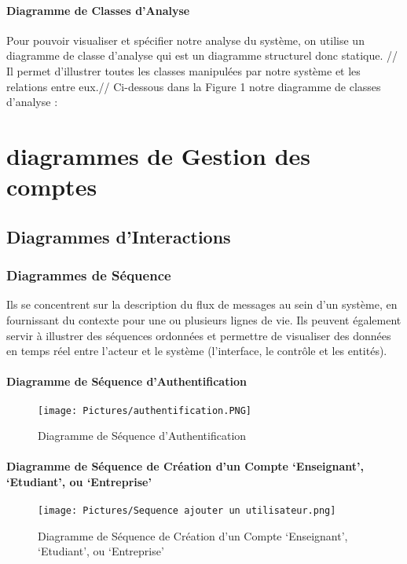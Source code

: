 \documentclass[11pt,fleqn]{book} %
\begin{document}
\subsubsection{Diagramme de Classes d’Analyse}
Pour pouvoir visualiser et spécifier notre analyse du système, on utilise un diagramme de classe d’analyse qui est un diagramme structurel donc statique. //
Il permet d’illustrer toutes les classes manipulées par notre système et les relations 
entre eux.//
Ci-dessous dans la Figure 1 notre diagramme de classes d’analyse :
\chapter{diagrammes de Gestion des comptes}
\section{Diagrammes d'Interactions}
\subsection{Diagrammes de Séquence}
Ils se concentrent sur la description du flux de messages au sein d'un système, en fournissant du contexte pour une ou plusieurs lignes de vie. Ils peuvent également servir à illustrer des séquences ordonnées et permettre de visualiser des données en temps réel entre l’acteur et le système (l’interface, le contrôle et les entités).
\newpage
\subsubsection{Diagramme de Séquence d’Authentification}
\begin{figure}[h]
    \centering
    \texttt{[image: Pictures/authentification.PNG]}
    \caption{Diagramme de Séquence d’Authentification}
    \label{fig:pca}
\end{figure}
\newpage
\subsubsection{Diagramme de Séquence de Création d’un 
Compte ‘Enseignant’, ‘Etudiant’, ou ‘Entreprise’}
\begin{figure}[h]
    \centering
    \texttt{[image: Pictures/Sequence ajouter un utilisateur.png]}
    \caption{Diagramme de Séquence de Création d’un 
Compte ‘Enseignant’, ‘Etudiant’, ou ‘Entreprise’}
    \label{fig:pca}
\end{figure}
\newpage
\end{document}
